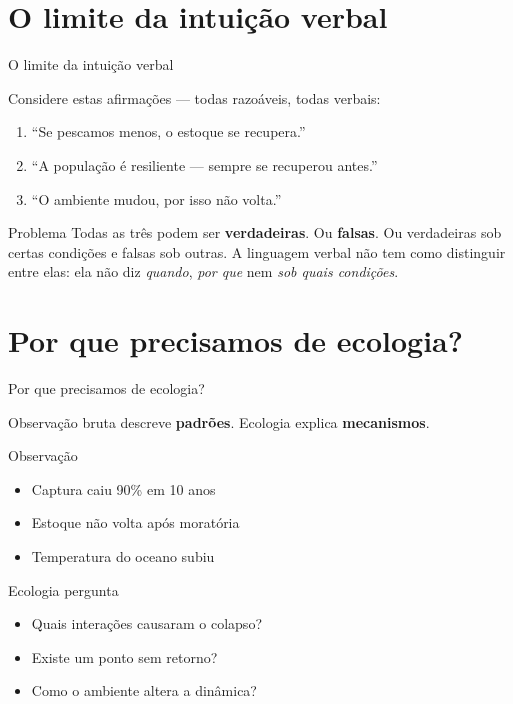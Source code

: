 \documentclass[12pt]{beamer}
\begin{document}
\section{O limite da intuição verbal}

\begin{frame}{O limite da intuição verbal}

  Considere estas afirmações --- todas razoáveis, todas verbais:

  \bigskip
  \begin{enumerate}
    \item ``Se pescamos menos, o estoque se recupera.''
    \item ``A população é resiliente --- sempre se recuperou antes.''
    \item ``O ambiente mudou, por isso não volta.''
  \end{enumerate}

  \bigskip
  \begin{alertblock}{Problema}
    Todas as três podem ser \textbf{verdadeiras}. Ou \textbf{falsas}.
    Ou verdadeiras sob certas condições e falsas sob outras.
    A linguagem verbal não tem como distinguir entre elas:
    ela não diz \emph{quando}, \emph{por que} nem \emph{sob quais condições}.
  \end{alertblock}

\end{frame}

\section{Por que precisamos de ecologia?}

\begin{frame}{Por que precisamos de ecologia?}

  Observação bruta descreve \textbf{padrões}.
  Ecologia explica \textbf{mecanismos}.

  \bigskip
  \begin{block}{Observação}
    \begin{itemize}
      \item Captura caiu 90\% em 10 anos
      \item Estoque não volta após moratória
      \item Temperatura do oceano subiu
    \end{itemize}
  \end{block}

  \begin{exampleblock}{Ecologia pergunta}
    \begin{itemize}
      \item Quais interações causaram o colapso?
      \item Existe um ponto sem retorno?
      \item Como o ambiente altera a dinâmica?
    \end{itemize}
  \end{exampleblock}

\end{frame}
\end{document}

